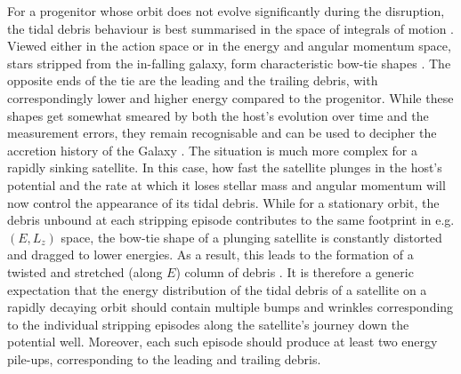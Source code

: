 \documentclass[a4paper,useAMS,usenatbib]{mnras}
\begin{document}
For a progenitor whose orbit does not evolve significantly during the disruption, the tidal debris behaviour is best summarised in the space of integrals of motion \citep[][]{Johnston1998, HelmiWhite1999}. Viewed either in the action space \citep[][]{Eyre2011} or in the energy and angular momentum space, stars stripped from the in-falling galaxy, form characteristic bow-tie shapes \citep[see e.g. Figure~1 in][]{Gibbons2014}. The opposite ends of the tie are the leading and the trailing debris, with correspondingly lower and higher energy compared to the progenitor. While these shapes get somewhat smeared by both the host's evolution over time and the measurement errors, they remain recognisable and can be used to decipher the accretion history of the Galaxy \citep[see][]{Helmi2000}. The situation is much more complex for a rapidly sinking satellite. In this case, how fast the satellite plunges in the host's potential and the rate at which it loses stellar mass and angular momentum will now control the appearance of its tidal debris. While for a stationary orbit, the debris unbound at each stripping episode contributes to the same footprint in e.g. $(E,L_z)$ space, the bow-tie shape of a plunging satellite is constantly distorted and dragged to lower energies. As a result, this leads to the formation of a twisted and stretched (along $E$) column of debris \citep[see e.g.][]{jb2017,Koppelman2020,Amarante2022,Khoperskov2022}. It is therefore a generic expectation that the energy distribution of the tidal debris of a satellite on a rapidly decaying orbit should contain multiple bumps and wrinkles corresponding to the individual stripping episodes along the satellite's journey down the potential well. Moreover, each such episode should produce at least two energy pile-ups, corresponding to the leading and trailing debris.
\end{document}
